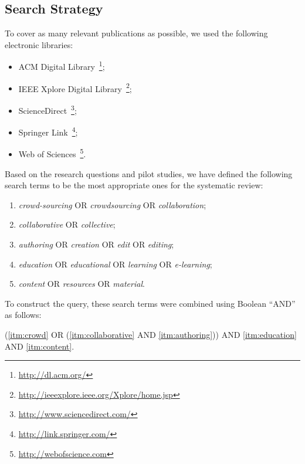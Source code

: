 \documentclass[PhD, Submit, ngerman,UKenglish,table]{scrbook}
\begin{document}
\subsection{Search Strategy}
\label{sec:searchStartegy}

To cover as many relevant publications as possible, we used the following electronic libraries:

\begin{itemize}
    \setlength{\itemsep}{0pt}
	\item ACM Digital Library~\footnote{\url{http://dl.acm.org/}};
	\item IEEE Xplore Digital Library~\footnote{\url{http://ieeexplore.ieee.org/Xplore/home.jsp}};
	\item ScienceDirect~\footnote{\url{http://www.sciencedirect.com/}};
	\item Springer Link~\footnote{\url{http://link.springer.com/}};
	\item Web of Sciences~\footnote{\url{http://webofscience.com}}.
\end{itemize}

Based on the research questions and pilot studies, we have defined the following search terms to be the most appropriate ones for the systematic review:

\begin{flushleft}
\begin{enumerate}
    \setlength{\itemsep}{0pt}
    \item \label{itm:crowd} \textit{crowd-sourcing} OR \textit{crowdsourcing} OR \textit{collaboration};
	\item \label{itm:collaborative} \textit{collaborative} OR \textit{collective}; 
	\item \label{itm:authoring} \textit{authoring} OR \textit{creation} OR \textit{edit} OR \textit{editing}; 
	\item \label{itm:education} \textit{education} OR \textit{educational} OR \textit{learning} OR \textit{e-learning};
	\item \label{itm:content} \textit{content} OR \textit{resources} OR \textit{material}.


\end{enumerate}
\end{flushleft}

To construct the query, these search terms were combined using Boolean ``AND''  as follows:

\begin{center}
(\ref{itm:crowd} OR (\ref{itm:collaborative} AND \ref{itm:authoring})) AND \ref{itm:education} AND \ref{itm:content}.
\end{center}
\end{document}

